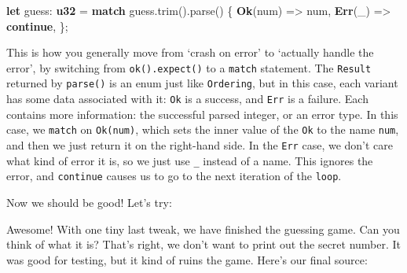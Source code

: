 \documentclass[a4paper,]{book}
\newenvironment{Shaded}{\begin{snugshade}}{\end{snugshade}}
\newcommand{\KeywordTok}[1]{\textcolor[rgb]{0.13,0.29,0.53}{\textbf{{#1}}}}
\newcommand{\NormalTok}[1]{{#1}}
\begin{document}
\begin{Shaded}
\begin{Highlighting}[]
\KeywordTok{let} \NormalTok{guess: }\KeywordTok{u32} \NormalTok{= }\KeywordTok{match} \NormalTok{guess.trim().parse() \{}
    \KeywordTok{Ok}\NormalTok{(num) => num,}
    \KeywordTok{Err}\NormalTok{(_) => }\KeywordTok{continue}\NormalTok{,}
\NormalTok{\};}
\end{Highlighting}
\end{Shaded}

This is how you generally move from `crash on error' to `actually handle
the error', by switching from \texttt{ok().expect()} to a \texttt{match}
statement. The \texttt{Result} returned by \texttt{parse()} is an enum
just like \texttt{Ordering}, but in this case, each variant has some
data associated with it: \texttt{Ok} is a success, and \texttt{Err} is a
failure. Each contains more information: the successful parsed integer,
or an error type. In this case, we \texttt{match} on \texttt{Ok(num)},
which sets the inner value of the \texttt{Ok} to the name \texttt{num},
and then we just return it on the right-hand side. In the \texttt{Err}
case, we don't care what kind of error it is, so we just use \texttt{\_}
instead of a name. This ignores the error, and \texttt{continue} causes
us to go to the next iteration of the \texttt{loop}.

Now we should be good! Let's try:

\begin{Shaded}
\end{Shaded}

Awesome! With one tiny last tweak, we have finished the guessing game.
Can you think of what it is? That's right, we don't want to print out
the secret number. It was good for testing, but it kind of ruins the
game. Here's our final source:
\end{document}
